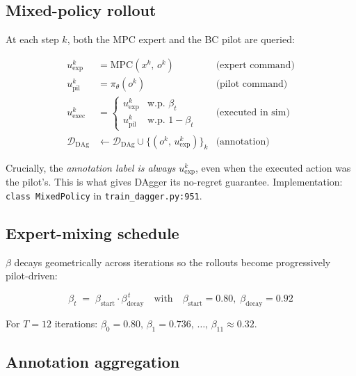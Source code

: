 \documentclass[11pt, a4paper]{article}
\newcommand{\D}{\mathcal{D}}
\begin{document}
\subsection{Mixed-policy rollout}

At each step $k$, both the MPC expert and the BC pilot are queried:

\begin{formulabox}
\begin{align}
u^k_{\text{exp}}   &= \mathrm{MPC}(x^k,\,o^k)               & \text{(expert command)}\\
u^k_{\text{pil}}   &= \pi_\theta(o^k)                       & \text{(pilot command)}\\
u^k_{\text{exec}}  &=
   \begin{cases}
     u^k_{\text{exp}} & \text{w.p. } \beta_t \\
     u^k_{\text{pil}} & \text{w.p. } 1-\beta_t
   \end{cases}
   & \text{(executed in sim)}\\[4pt]
\D_{\text{DAg}}    &\leftarrow \D_{\text{DAg}} \cup
   \bigl\{(o^k,\,u^k_{\text{exp}})\bigr\}_{k}    & \text{(annotation)}
\end{align}
\end{formulabox}

\noindent
Crucially, the \emph{annotation label is always $u^k_{\text{exp}}$}, even
when the executed action was the pilot's. This is what gives DAgger its
no-regret guarantee.
Implementation: \texttt{class MixedPolicy} in \texttt{train\_dagger.py:951}.

\subsection{Expert-mixing schedule}

$\beta$ decays geometrically across iterations so the rollouts become
progressively pilot-driven:

\begin{formulabox}
\begin{equation}
\beta_t \;=\; \beta_{\text{start}}\cdot\beta_{\text{decay}}^{\,t}
\quad\text{with}\quad
\beta_{\text{start}} = 0.80,\;
\beta_{\text{decay}} = 0.92
\end{equation}
\end{formulabox}

\noindent
For $T = 12$ iterations: $\beta_0 = 0.80,\,\beta_1 = 0.736,\,\dots,\,\beta_{11} \approx 0.32$.

\subsection{Annotation aggregation}
\end{document}
